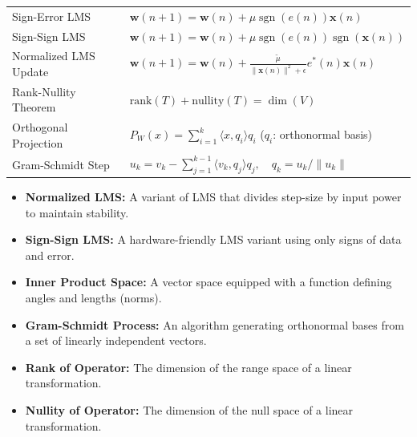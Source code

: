 \documentclass[12pt,a4paper]{article}
\renewcommand{\arraystretch}{1.45}
\begin{document}
\begin{tcolorbox}[formulabox, title={\textbf{Key Formulas at a Glance}}]
\renewcommand{\arraystretch}{1.3}
\begin{tabularx}{\linewidth}{B{4.5cm} X}Sign-Error LMS & $\mathbf{w}(n+1) = \mathbf{w}(n) + \mu \operatorname{sgn}(e(n)) \mathbf{x}(n)$ \\[6pt]
Sign-Sign LMS & $\mathbf{w}(n+1) = \mathbf{w}(n) + \mu \operatorname{sgn}(e(n)) \operatorname{sgn}(\mathbf{x}(n))$ \\[6pt]
Normalized LMS Update & $\mathbf{w}(n+1) = \mathbf{w}(n) + \frac{\tilde{\mu}}{\|\mathbf{x}(n)\|^2 + \epsilon} e^*(n) \mathbf{x}(n)$ \\[6pt]
Rank-Nullity Theorem & $\text{rank}(T) + \text{nullity}(T) = \dim(V)$ \\[6pt]
Orthogonal Projection & $P_W(x) = \sum_{i=1}^k \langle x, q_i \rangle q_i$ \quad ($q_i$: orthonormal basis) \\[6pt]
Gram-Schmidt Step & $u_k = v_k - \sum_{j=1}^{k-1} \langle v_k, q_j \rangle q_j, \quad q_k = u_k/\|u_k\|$
\end{tabularx}
\end{tcolorbox}

\begin{tcolorbox}[defbox, title={\textbf{One-Line Definitions}}]
\begin{itemize}[leftmargin=*, itemsep=2.5pt, topsep=0pt]
  \item \textbf{Normalized LMS:} A variant of LMS that divides step-size by input power to maintain stability.
  \item \textbf{Sign-Sign LMS:} A hardware-friendly LMS variant using only signs of data and error.
  \item \textbf{Inner Product Space:} A vector space equipped with a function defining angles and lengths (norms).
  \item \textbf{Gram-Schmidt Process:} An algorithm generating orthonormal bases from a set of linearly independent vectors.
  \item \textbf{Rank of Operator:} The dimension of the range space of a linear transformation.
  \item \textbf{Nullity of Operator:} The dimension of the null space of a linear transformation.
\end{itemize}
\end{tcolorbox}
\end{document}
